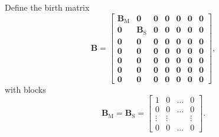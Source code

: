 \documentclass[12pt]{article}
\newcommand{\mat}[1]{\mathbf{#1}}
\begin{document}
Define the birth matrix
\begin{equation}
  \mat{B} =
  \begin{bmatrix}
    \mat{B}_{\mathrm{M}} & \mat{0} & \mat{0} &
    \mat{0} & \mat{0} & \mat{0} & \mat{0}
    \\
    \mat{0} & \mat{B}_{\mathrm{S}} & \mat{0} &
    \mat{0} & \mat{0} & \mat{0} & \mat{0}
    \\
    \mat{0} & \mat{0} & \mat{0} & \mat{0} &
    \mat{0} & \mat{0} & \mat{0}
    \\
    \mat{0} & \mat{0} & \mat{0} & \mat{0} &
    \mat{0} & \mat{0} & \mat{0}
    \\
    \mat{0} & \mat{0} & \mat{0} & \mat{0} &
    \mat{0} & \mat{0} & \mat{0}
    \\
    \mat{0} & \mat{0} & \mat{0} & \mat{0} &
    \mat{0} & \mat{0} & \mat{0}
    \\
    \mat{0} & \mat{0} & \mat{0} & \mat{0} &
    \mat{0} & \mat{0} & \mat{0}
  \end{bmatrix},
\end{equation}
with blocks
\begin{equation}
  \mat{B}_{\mathrm{M}} = \mat{B}_{\mathrm{S}}
  =
  \begin{bmatrix}
    1 & 0 & \hdots & 0 \\
    0 & 0 & \hdots & 0 \\
    \vdots & \vdots & & \vdots \\
    0 & 0 & \hdots & 0
  \end{bmatrix}.
\end{equation}
\end{document}
